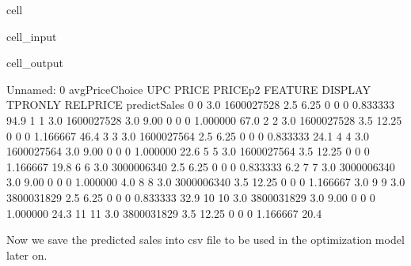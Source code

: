 \documentclass[letterpaper,10pt,english]{jupyterBook}
\begin{document}
\begin{sphinxuseclass}{cell}
\begin{sphinxVerbatimInput}
\begin{sphinxuseclass}{cell_input}
\begin{sphinxVerbatim}[commandchars=\\\{\}]
    \PYG{p}{[}\PYG{p}{]}   

\PYG{p}{[}\PYG{p}{]}  
\end{sphinxVerbatim}

\end{sphinxuseclass}\end{sphinxVerbatimInput}
\begin{sphinxVerbatimOutput}

\begin{sphinxuseclass}{cell_output}
\begin{sphinxVerbatim}[commandchars=\\\{\}]
    Unnamed: 0  avgPriceChoice         UPC  PRICE  PRICE\PYGZus{}p2  FEATURE  DISPLAY  TPR\PYGZus{}ONLY  RELPRICE  predictSales
0            0             3.0  1600027528    2.5      6.25        0        0         0  0.833333          94.9
1            1             3.0  1600027528    3.0      9.00        0        0         0  1.000000          67.0
2            2             3.0  1600027528    3.5     12.25        0        0         0  1.166667          46.4
3            3             3.0  1600027564    2.5      6.25        0        0         0  0.833333          24.1
4            4             3.0  1600027564    3.0      9.00        0        0         0  1.000000          22.6
5            5             3.0  1600027564    3.5     12.25        0        0         0  1.166667          19.8
6            6             3.0  3000006340    2.5      6.25        0        0         0  0.833333           6.2
7            7             3.0  3000006340    3.0      9.00        0        0         0  1.000000           4.0
8            8             3.0  3000006340    3.5     12.25        0        0         0  1.166667           3.0
9            9             3.0  3800031829    2.5      6.25        0        0         0  0.833333          32.9
10          10             3.0  3800031829    3.0      9.00        0        0         0  1.000000          24.3
11          11             3.0  3800031829    3.5     12.25        0        0         0  1.166667          20.4
\end{sphinxVerbatim}

\end{sphinxuseclass}\end{sphinxVerbatimOutput}

\end{sphinxuseclass}
\sphinxAtStartPar
Now we save the predicted sales into csv file to be used in the optimization model later on.
\end{document}
